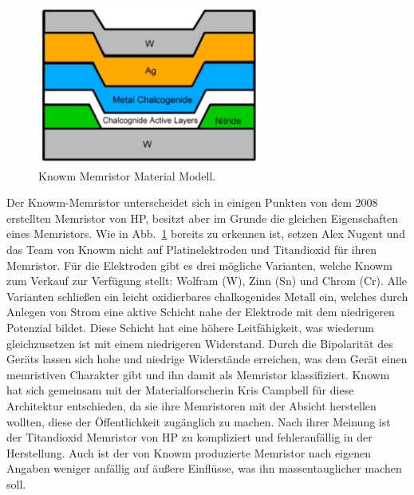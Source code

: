 \begin{figure}
  \centering
    \includegraphics[width=0.65\textwidth]{images/Knowm_Mem.jpg}
  \caption{Knowm Memristor Material Modell.}
  \label{fig:knowm_mem}
\end{figure}

Der Knowm-Memristor unterscheidet sich in einigen Punkten von dem 2008 erstellten Memristor von HP, besitzt aber im Grunde die gleichen Eigenschaften eines Memristors. Wie in Abb.~\ref{fig:knowm_mem} bereits zu erkennen ist, setzen Alex Nugent und das Team von Knowm nicht auf Platinelektroden und Titandioxid für ihren Memristor. Für die Elektroden gibt es drei mögliche Varianten, welche Knowm zum Verkauf zur Verfügung stellt: Wolfram (W), Zinn (Sn) und Chrom (Cr). Alle Varianten schließen ein leicht oxidierbares chalkogenides Metall ein, welches durch Anlegen von Strom eine aktive Schicht nahe der Elektrode mit dem niedrigeren Potenzial bildet. Diese Schicht hat eine höhere Leitfähigkeit, was wiederum gleichzusetzen ist mit einem niedrigeren Widerstand. Durch die Bipolarität des Geräts lassen sich hohe und niedrige Widerstände erreichen, was dem Gerät einen memristiven Charakter gibt und ihn damit als Memristor klassifiziert.
Knowm hat sich gemeinsam mit der Materialforscherin Kris Campbell für diese Architektur entschieden, da sie ihre Memristoren mit der Absicht herstellen wollten, diese der Öffentlichkeit zugänglich zu machen. Nach ihrer Meinung ist der Titandioxid Memristor von HP zu kompliziert und fehleranfällig in der Herstellung. Auch ist der von Knowm produzierte Memristor nach eigenen Angaben weniger anfällig auf äußere Einflüsse, was ihn massentauglicher machen soll.


